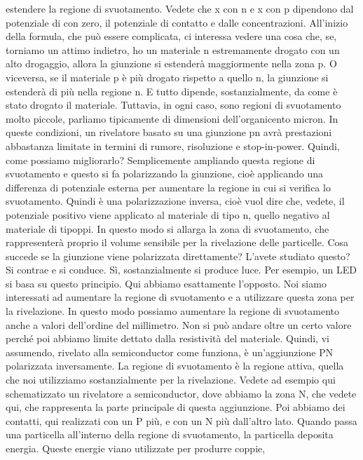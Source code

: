 {estendere la regione di svuotamento. Vedete che x con n e x con p dipendono dal potenziale di con zero, il potenziale di contatto e dalle concentrazioni. All'inizio della formula, che può essere complicata, ci interessa vedere una cosa che, se, torniamo un attimo indietro, ho un materiale n estremamente drogato con un alto drogaggio, allora la giunzione si estenderà maggiormente nella zona p. O viceversa, se il materiale p è più drogato rispetto a quello n, la giunzione si estenderà di più nella regione n. E tutto dipende, sostanzialmente, da come è stato drogato il materiale. Tuttavia, in ogni caso, sono regioni di svuotamento molto piccole, parliamo tipicamente di dimensioni dell'organicento micron. In queste condizioni, un rivelatore basato su una giunzione pn avrà prestazioni abbastanza limitate in termini di rumore, risoluzione e stop-in-power. Quindi, come possiamo migliorarlo? Semplicemente ampliando questa regione di svuotamento e questo si fa polarizzando la giunzione, cioè applicando una differenza di potenziale esterna per aumentare la regione in cui si verifica lo svuotamento. Quindi è una polarizzazione inversa, cioè vuol dire che, vedete, il potenziale positivo viene applicato al materiale di tipo n, quello negativo al materiale di tipoppi. In questo modo si allarga la zona di svuotamento, che rappresenterà proprio il volume sensibile per la rivelazione delle particelle. Cosa succede se la giunzione viene polarizzata direttamente? L'avete studiato questo? Si contrae e si conduce. Sì, sostanzialmente si produce luce. Per esempio, un LED si basa su questo principio. Qui abbiamo esattamente l'opposto. Noi siamo interessati ad aumentare la regione di svuotamento e a utilizzare questa zona per la rivelazione. In questo modo possiamo aumentare la regione di svuotamento anche a valori dell'ordine del millimetro. Non si può andare oltre un certo valore perché poi abbiamo limite dettato dalla resistività del materiale. Quindi, vi assumendo, rivelato alla semiconductor come funziona, è un'aggiunzione PN polarizzata inversamente. La regione di svuotamento è la regione attiva, quella che noi utilizziamo sostanzialmente per la rivelazione. Vedete ad esempio qui schematizzato un rivelatore a semiconductor, dove abbiamo la zona N, che vedete qui, che rappresenta la parte principale di questa aggiunzione. Poi abbiamo dei contatti, qui realizzati con un P più, e con un N più dall'altro lato. Quando passa una particella all'interno della regione di svuotamento, la particella deposita energia. Queste energie viano utilizzate per produrre coppie, 

}
